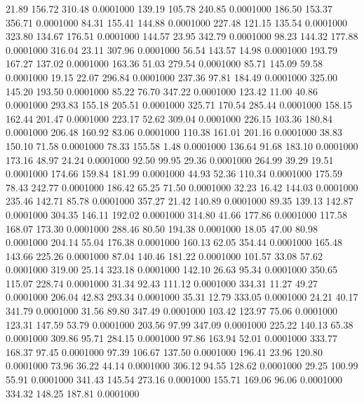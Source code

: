   21.89  156.72  310.48   0.0001000
 139.19  105.78  240.85   0.0001000
 186.50  153.37  356.71   0.0001000
  84.31  155.41  144.88   0.0001000
 227.48  121.15  135.54   0.0001000
 323.80  134.67  176.51   0.0001000
 144.57   23.95  342.79   0.0001000
  98.23  144.32  177.88   0.0001000
 316.04   23.11  307.96   0.0001000
  56.54  143.57   14.98   0.0001000
 193.79  167.27  137.02   0.0001000
 163.36   51.03  279.54   0.0001000
  85.71  145.09   59.58   0.0001000
  19.15   22.07  296.84   0.0001000
 237.36   97.81  184.49   0.0001000
 325.00  145.20  193.50   0.0001000
  85.22   76.70  347.22   0.0001000
 123.42   11.00   40.86   0.0001000
 293.83  155.18  205.51   0.0001000
 325.71  170.54  285.44   0.0001000
 158.15  162.44  201.47   0.0001000
 223.17   52.62  309.04   0.0001000
 226.15  103.36  180.84   0.0001000
 206.48  160.92   83.06   0.0001000
 110.38  161.01  201.16   0.0001000
  38.83  150.10   71.58   0.0001000
  78.33  155.58    1.48   0.0001000
 136.64   91.68  183.10   0.0001000
 173.16   48.97   24.24   0.0001000
  92.50   99.95   29.36   0.0001000
 264.99   39.29   19.51   0.0001000
 174.66  159.84  181.99   0.0001000
  44.93   52.36  110.34   0.0001000
 175.59   78.43  242.77   0.0001000
 186.42   65.25   71.50   0.0001000
  32.23   16.42  144.03   0.0001000
 235.46  142.71   85.78   0.0001000
 357.27   21.42  140.89   0.0001000
  89.35  139.13  142.87   0.0001000
 304.35  146.11  192.02   0.0001000
 314.80   41.66  177.86   0.0001000
 117.58  168.07  173.30   0.0001000
 288.46   80.50  194.38   0.0001000
  18.05   47.00   80.98   0.0001000
 204.14   55.04  176.38   0.0001000
 160.13   62.05  354.44   0.0001000
 165.48  143.66  225.26   0.0001000
  87.04  140.46  181.22   0.0001000
 101.57   33.08   57.62   0.0001000
 319.00   25.14  323.18   0.0001000
 142.10   26.63   95.34   0.0001000
 350.65  115.07  228.74   0.0001000
  31.34   92.43  111.12   0.0001000
 334.31   11.27   49.27   0.0001000
 206.04   42.83  293.34   0.0001000
  35.31   12.79  333.05   0.0001000
  24.21   40.17  341.79   0.0001000
  31.56   89.80  347.49   0.0001000
 103.42  123.97   75.06   0.0001000
 123.31  147.59   53.79   0.0001000
 203.56   97.99  347.09   0.0001000
 225.22  140.13   65.38   0.0001000
 309.86   95.71  284.15   0.0001000
  97.86  163.94   52.01   0.0001000
 333.77  168.37   97.45   0.0001000
  97.39  106.67  137.50   0.0001000
 196.41   23.96  120.80   0.0001000
  73.96   36.22   44.14   0.0001000
 306.12   94.55  128.62   0.0001000
  29.25  100.99   55.91   0.0001000
 341.43  145.54  273.16   0.0001000
 155.71  169.06   96.06   0.0001000
 334.32  148.25  187.81   0.0001000
